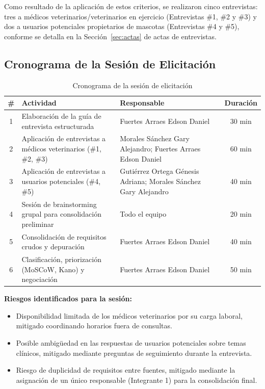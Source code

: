 Como resultado de la aplicación de estos criterios, se realizaron cinco entrevistas: tres a médicos veterinarios/veterinarios en ejercicio (Entrevistas \#1, \#2 y \#3) y dos a usuarios potenciales propietarios de mascotas (Entrevistas \#4 y \#5), conforme se detalla en la Sección~\ref{sec:actas} de actas de entrevistas.

\subsection{Cronograma de la Sesión de Elicitación}

\begin{table}[H]
	\centering
	\caption{Cronograma de la sesión de elicitación}
	\label{tab:cronograma}
	\begin{tabular}{|c|p{6.5cm}|p{4cm}|c|}
		\hline
		\textbf{\#} & \textbf{Actividad} & \textbf{Responsable} & \textbf{Duración} \\ \hline
		1 & Elaboración de la guía de entrevista estructurada & Fuertes Arraes Edson Daniel & 30 min \\ \hline
		2 & Aplicación de entrevistas a médicos veterinarios (\#1, \#2, \#3) & Morales Sánchez Gary Alejandro; Fuertes Arraes Edson Daniel & 60 min \\ \hline
		3 & Aplicación de entrevistas a usuarios potenciales (\#4, \#5) & Gutiérrez Ortega Génesis Adriana; Morales Sánchez Gary Alejandro & 40 min \\ \hline
		4 & Sesión de brainstorming grupal para consolidación preliminar & Todo el equipo & 20 min \\ \hline
		5 & Consolidación de requisitos crudos y depuración & Fuertes Arraes Edson Daniel & 40 min \\ \hline
		6 & Clasificación, priorización (MoSCoW, Kano) y negociación & Fuertes Arraes Edson Daniel & 50 min \\ \hline
	\end{tabular}
\end{table}

\textbf{Riesgos identificados para la sesión:}
\begin{itemize}[leftmargin=*]
	\item Disponibilidad limitada de los médicos veterinarios por su carga laboral, mitigado coordinando horarios fuera de consultas.
	\item Posible ambigüedad en las respuestas de usuarios potenciales sobre temas clínicos, mitigado mediante preguntas de seguimiento durante la entrevista.
	\item Riesgo de duplicidad de requisitos entre fuentes, mitigado mediante la asignación de un único responsable (Integrante 1) para la consolidación final.
\end{itemize}

